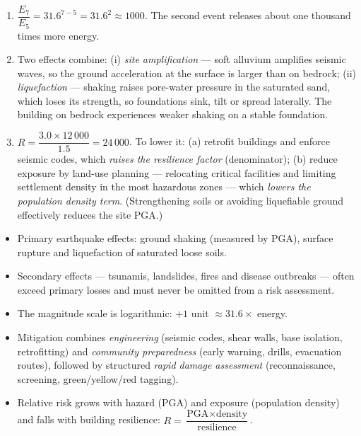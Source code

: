 \documentclass[11pt]{article}
\newcommand{\cle}[1]{{\popxbold\color{popdark}#1}}
\begin{document}
\begin{corrige}[Exercise 1]
\begin{enumerate}
\item $\dfrac{E_7}{E_5} = 31.6^{7-5} = 31.6^2 \approx 1000$. The second event releases about one thousand times more energy.
\item Two effects combine: (i) \emph{site amplification} — soft alluvium amplifies seismic waves, so the ground acceleration at the surface is larger than on bedrock; (ii) \emph{liquefaction} — shaking raises pore-water pressure in the saturated sand, which loses its strength, so foundations sink, tilt or spread laterally. The building on bedrock experiences weaker shaking on a stable foundation.
\item $R = \dfrac{3.0 \times 12\,000}{1.5} = 24\,000$. To lower it: (a) retrofit buildings and enforce seismic codes, which \emph{raises the resilience factor} (denominator); (b) reduce exposure by land-use planning — relocating critical facilities and limiting settlement density in the most hazardous zones — which \emph{lowers the population density term}. (Strengthening soils or avoiding liquefiable ground effectively reduces the site PGA.)
\end{enumerate}
\end{corrige}

\begin{aretenir}
\begin{itemize}
\item Primary earthquake effects: \cle{ground shaking} (measured by PGA), \cle{surface rupture} and \cle{liquefaction} of saturated loose soils.
\item Secondary effects — \cle{tsunamis}, \cle{landslides}, \cle{fires} and \cle{disease outbreaks} — often exceed primary losses and must never be omitted from a risk assessment.
\item The magnitude scale is logarithmic: $+1$ unit $\approx 31.6\times$ energy.
\item Mitigation combines \emph{engineering} (seismic codes, shear walls, base isolation, retrofitting) and \emph{community preparedness} (early warning, drills, evacuation routes), followed by structured \emph{rapid damage assessment} (reconnaissance, screening, green/yellow/red tagging).
\item Relative risk grows with hazard (PGA) and exposure (population density) and falls with building resilience: $R = \dfrac{\text{PGA} \times \text{density}}{\text{resilience}}$.
\end{itemize}
\end{aretenir}
\end{document}
